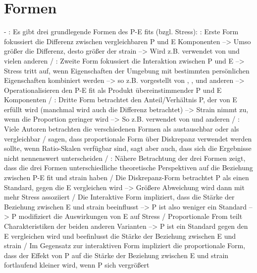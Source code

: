 \section{Formen}
\label{ch:personEnvironmentFit:formen}
- \cite[S. 5]{edwards:1990}: Es gibt drei grundlegende Formen des P-E fits (bzgl. Stress): \cite[S. 5]{edwards:1990}: Erste Form fokussiert die Differenz zwischen vergleichbaren P und E Komponenten --> Umso größer die Differenz, desto größer der strain --> Wird z.B. verwendet von \textcite{mechanismsOfJobStressAndStrain:1982} und vielen anderen / \cite[S. 5]{edwards:1990}: Zweite Form fokussiert die Interaktion zwischen P und E --> Stress tritt auf, wenn Eigenschaften der Umgebung mit bestimmten persönlichen Eigenschaften kombiniert werden --> so z.B. vorgestellt von \textcite{cherringtonEngland:1980}, \textcite{lyons:1971}, \textcite{obrien:1980} und anderen --> Operationalisieren den P-E fit als Produkt übereinstimmender P und E Komponenten / \cite[S. 5]{edwards:1990}: Dritte Form betrachtet den Anteil/Verhältnis P, der von E erfüllt wird (manchmal wird auch die Differenz betrachtet) --> Strain nimmt zu, wenn die Proportion geringer wird --> So z.B. verwendet von \textcite{mechanismsOfJobStressAndStrain:1982} und anderen / \cite[S. 5]{edwards:1990}: Viele Autoren betrachten die verschiedenen Formen als austauschbar oder als vergleichbar /  \textcite{mechanismsOfJobStressAndStrain:1982} sagen, dass proportionale Form über Diskrepanz verwendet werden sollte, wenn Ratio-Skalen verfügbar sind, sagt aber auch, dass sich die Ergebnisse nicht nennenswert unterscheiden / \cite[S. 5]{edwards:1990}: Nähere Betrachtung der drei Formen zeigt, dass die drei Formen unterschiedliche theoretische Perspektiven auf die Beziehung zwischen P-E fit und strain haben / Die Diskrepanz-Form betrachtet P als einen Standard, gegen die E vergleichen wird --> Größere Abweichung wird dann mit mehr Stress assoziiert / Die Interaktive Form impliziert, dass die Stärke der Beziehung zwischen E und strain beeinflusst --> P ist also weniger ein Standard --> P modifiziert die Auswirkungen von E auf Stress / Proportionale From teilt Charakteristiken der beiden anderen Varianten --> P ist ein Standard gegen den E vergleichen wird und beefinlusst die Stärke der Beziehung zwischen E und strain / Im Gegensatz zur interaktiven Form impliziert die proportionale Form, dass der Effekt von P auf die Stärke der Beziehung zwischen E und strain fortlaufend kleiner wird, wenn P sich vergrößert \\
